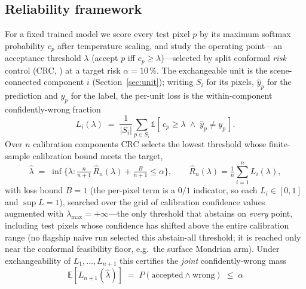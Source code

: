 \documentclass[preprint,3p,times]{elsarticle}
\begin{document}
\subsection{Reliability framework}
For a fixed trained model we score every test pixel $p$ by its maximum softmax probability $c_p$ after temperature scaling, and study the operating point---an acceptance threshold $\lambda$ (accept $p$ iff $c_p \geq \lambda$)---selected by split conformal \emph{risk} control (CRC, \citealt{angelopoulos2024}) at a target risk $\alpha = 10\,\%$. The exchangeable unit is the scene-connected component $i$ (Section~\ref{sec:unit}); writing $S_i$ for its pixels, $\hat{y}_p$ for the prediction and $y_p$ for the label, the per-unit loss is the within-component confidently-wrong fraction
\begin{equation}
L_i(\lambda) \;=\; \frac{1}{|S_i|}\sum_{p \in S_i} \mathbb{1}\!\left[\,c_p \geq \lambda \;\wedge\; \hat{y}_p \neq y_p\,\right].
\label{eq:loss}
\end{equation}
Over $n$ calibration components CRC selects the lowest threshold whose finite-sample calibration bound meets the target,
\begin{equation}
\hat{\lambda} \;=\; \inf\Big\{\lambda : \tfrac{n}{n+1}\,\hat{R}_n(\lambda) + \tfrac{B}{n+1} \leq \alpha\Big\}, \qquad \hat{R}_n(\lambda) = \tfrac{1}{n}\sum_{i=1}^{n} L_i(\lambda),
\label{eq:crc}
\end{equation}
with loss bound $B = 1$ (the per-pixel term is a $0/1$ indicator, so each $L_i \in [0,1]$ and $\sup L = 1$), searched over the grid of calibration confidence values augmented with $\lambda_{\max} = +\infty$---the only threshold that abstains on \emph{every} point, including test pixels whose confidence has shifted above the entire calibration range (no flagship naive run selected this abstain-all threshold; it is reached only near the conformal feasibility floor, e.g.\ the surface Mondrian arm). Under exchangeability of $L_1,\dots,L_{n+1}$ this certifies the \emph{joint} confidently-wrong mass
\begin{equation}
\mathbb{E}\!\left[L_{n+1}(\hat{\lambda})\right] \;=\; P(\text{accepted} \wedge \text{wrong}) \;\leq\; \alpha
\label{eq:guarantee}
\end{equation}
\end{document}
